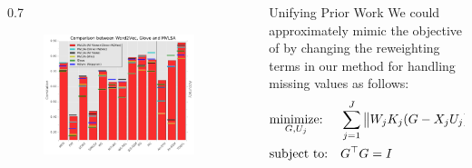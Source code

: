 \begin{frame}[t]
\begin{columns}[t]
\begin{column}{\twocolwid}
\begin{column}{\twocolwid}
\begin{columns}[t,totalwidth=\twocolwid]
\begin{column}{0.7\twocolwid}
\begin{figure}
        \includegraphics[width=\linewidth]{comparative_figure.pdf}
        \end{figure}
      \end{column}
    \end{columns}
  \end{column}
\end{column}
\begin{column}{\sepwid}\end{column} 
\begin{column}{\onecolwid}\vspace{-0.4in}
  \begin{alertblock}{Unifying Prior Work}
    We could approximately mimic the objective of
    \cite{pennington2014glove} by changing the reweighting terms in
    our method for handling missing values as follows:
    \begin{eqnarray}
      \label{eq:gcca3}
      \begin{aligned} & \underset{G,U_j}{\textrm{minimize:}} & & \sum_{j=1}^J \begin{Vmatrix} W_j K_j(G - X_jU_j) \end{Vmatrix}^2_F \\ & \textrm{subject to:} & & G^\top G = I  \end{aligned}
    \end{eqnarray}


\end{alertblock}
\end{column}
\end{columns}
\end{frame}
